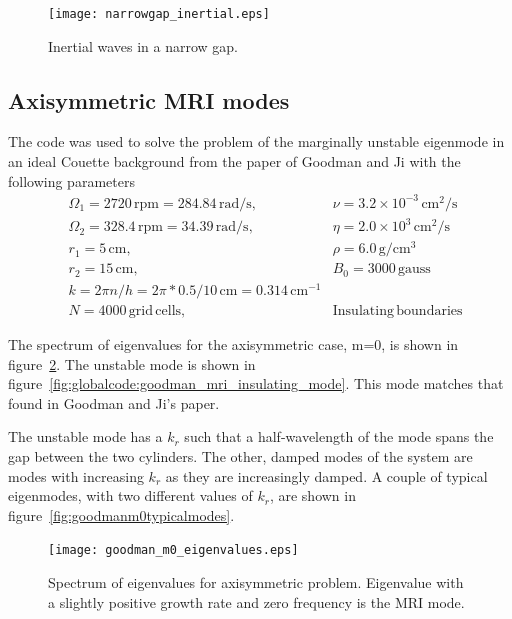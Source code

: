 \documentclass[letterpaper]{article}
\begin{document}
\begin{figure}
\begin{center}
\texttt{[image: narrowgap\_inertial.eps]}
\caption{Inertial waves in a narrow gap.}
\label{fig:narrowgapinertial}
\end{center}
\end{figure}

\subsection{Axisymmetric MRI modes}

The code was used to solve the problem of the marginally unstable
eigenmode in an ideal Couette background from the paper of Goodman and
Ji with the following parameters
\begin{align*}
&\Omega_1 = 2720\,\mathrm{rpm} = 284.84\,\mathrm{rad/s},\quad
    &\nu = 3.2\times10^{-3}\,\mathrm{cm^2/s}
\\
&\Omega_2 = 328.4\,\mathrm{rpm} = 34.39\,\mathrm{rad/s},\quad
    &\eta = 2.0\times10^{3}\,\mathrm{cm^2/s}
\\
&r_1 = 5\,\mathrm{cm},\quad &\rho = 6.0\,\mathrm{g/cm^3}
\\
&r_2 = 15\,\mathrm{cm},\quad &B_0 = 3000\, \mathrm{gauss}
\\
&k = 2\pi n/h = 2\pi*0.5/10\,\mathrm{cm} = 0.314\,\mathrm{cm^{-1}}
\\
&N = 4000\,\mathrm{grid\,cells},\quad &\mathrm{Insulating\,boundaries}
\end{align*}

The spectrum of eigenvalues for the axisymmetric case, m=0, is shown
in figure~\ref{fig:goodmanm0eigenvalues}. The unstable mode is shown
in figure~\ref{fig:globalcode:goodman_mri_insulating_mode}. This mode
matches that found in Goodman and Ji's paper.

The unstable mode has a $k_r$ such that a half-wavelength of the mode
spans the gap between the two cylinders.  The other, damped modes of
the system are modes with increasing $k_r$ as they are increasingly
damped.  A couple of typical eigenmodes, with two different values of
$k_r$, are shown in figure~\ref{fig:goodmanm0typicalmodes}.

\begin{figure}
\begin{center}
\texttt{[image: goodman\_m0\_eigenvalues.eps]}
\caption{Spectrum of eigenvalues for axisymmetric problem.  Eigenvalue
  with a slightly positive growth rate and zero frequency is the MRI
  mode.}
\label{fig:goodmanm0eigenvalues}
\end{center}
\end{figure}
\end{document}
